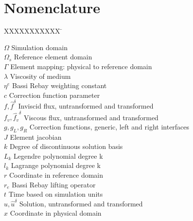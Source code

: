 \section*{Nomenclature}

 \begin{tabbing}
  XXXXXXXXXXX \= \kill %

$\Omega$ \> Simulation domain \\
$\Omega_s$ \> Reference element domain \\
$\Gamma$ \> Element mapping: physical to reference domain \\
$\lambda$ \> Viscosity of medium \\
$\eta^e$ \> Bassi Rebay weighting constant \\

$c$ \> Correction function parameter \\
$f, \hat{f}^{\delta} $ \> Inviscid flux, untransformed and transformed \\

$f_v, \hat{f_v}^{\delta} $ \> Viscous flux, untransformed and transformed \\

$g, g_L, g_R$ \> Correction functions, generic, left and right interfaces \\

$J$ \> Element jacobian \\

$k$ \> Degree of discontinuous solution basis \\
$L_k$ \> Legendre polynomial degree k \\
$l_k$ \> Lagrange polynomial degree k \\

$r$ \> Coordinate in reference domain \\
$r_e$ \> Bassi Rebay lifting operator \\
$t$ \> Time based on simulation units \\
$u, \hat{u}^{\delta} $ \> Solution, untransformed and transformed \\
$x$ \> Coordinate in physical domain \\

 \end{tabbing}